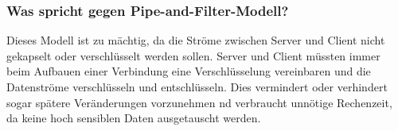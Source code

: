 \subsubsection{Was spricht gegen Pipe-and-Filter-Modell?}
Dieses Modell ist zu mächtig, da die Ströme zwischen Server und Client nicht gekapselt oder verschlüsselt werden sollen. Server und Client müssten immer beim Aufbauen einer Verbindung eine Verschlüsselung vereinbaren und die Datenströme verschlüsseln und entschlüsseln. Dies vermindert oder verhindert sogar spätere Veränderungen vorzunehmen nd verbraucht unnötige Rechenzeit, da keine hoch sensiblen Daten ausgetauscht werden.
